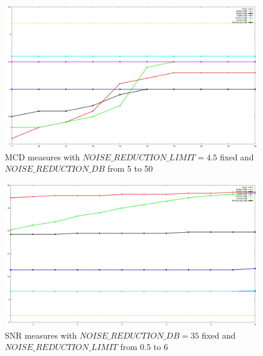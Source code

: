 \begin{figure}[!htb]
\begin{centering}
\includegraphics[width=\textwidth]{images/noise_red_mcd_exp.jpg}
\caption{MCD measures with $NOISE\_REDUCTION\_LIMIT = 4.5$ fixed and $NOISE\_REDUCTION\_DB$ from 5 to 50}
\label{fig:noise_red_mcd}
\end{centering}
\end{figure}

\begin{figure}[!htb]
\begin{centering}
\includegraphics[width=\textwidth]{images/noise_red_lim_snr_exp.jpg}
\caption{SNR measures with $NOISE\_REDUCTION\_DB = 35$ fixed and $NOISE\_REDUCTION\_LIMIT$ from 0.5 to 6}
\label{fig:noise_red_lim_snr}
\end{centering}
\end{figure}

